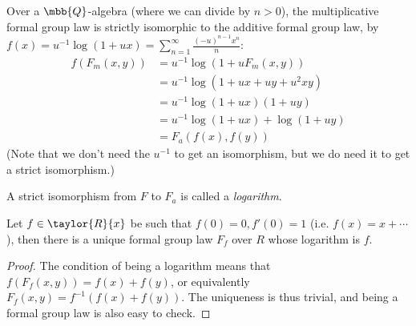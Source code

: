 \begin{example*}
	Over a $\mbb{Q}$-algebra (where we can divide by $n>0$), the multiplicative formal group law is strictly isomorphic to the additive formal group law,
	by $f\left(x\right) = u^{-1} \log \left(1+ux\right) = \sum_{n=1}^{\infty} \frac{\left(-u\right)^{n-1} x^n}{n}$:
	\begin{align*}
		f\left(F_m\left(x,y\right)\right)
		&= u^{-1} \log \left(1+u F_m\left(x,y\right)\right)\\
		&= u^{-1} \log \left(1+ux+uy+u^2 xy\right)\\
		&= u^{-1} \log \left(1+ux\right)\left(1+uy\right)\\
		&= u^{-1} \log \left(1+ux\right) + \log \left(1+uy\right)\\
		&= F_a\left(f\left(x\right), f\left(y\right)\right)
	\end{align*}
	(Note that we don't need the $u^{-1}$ to get an isomorphism, but we do need it to get a strict isomorphism.)
\end{example*}

\begin{definition*}
	A strict isomorphism from $F$ to $F_a$ is called a \emph{logarithm}.
\end{definition*}

\begin{lemma*}
	Let $f \in \taylor{R}{x}$ be such that $f\left(0\right) = 0, f'\left(0\right) = 1$ (i.e. $f\left(x\right) = x + \cdots$),
	then there is a unique formal group law $F_f$ over $R$ whose logarithm is $f$.
\end{lemma*}

\begin{proof}
	The condition of being a logarithm means that $f\left(F_f\left(x,y\right)\right) = f\left(x\right) + f\left(y\right)$, or equivalently $F_f\left(x,y\right) = f^{-1}\left(f\left(x\right) + f\left(y\right)\right)$.
	The uniqueness is thus trivial, and being a formal group law is also easy to check.
\end{proof}
